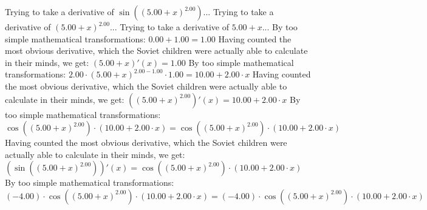 \documentclass{article}
\begin{document}
\newline
Trying to take a derivative of $ \sin {\left({\left({{5.00} + {x}}\right) ^ {2.00}}\right)} $...\newline
\newline
Trying to take a derivative of ${\left({{5.00} + {x}}\right) ^ {2.00}}$...\newline
\newline
Trying to take a derivative of ${{5.00} + {x}}$...\newline
\newline
By too simple mathematical transformations:
 ${{0.00} + {1.00}} = {1.00}$ 
 \newline
 \newline 
Having counted the most obvious derivative, which the Soviet children were actually able to calculate in their minds, we get:
$({{5.00} + {x}})'(x) = {1.00}$\newline
\newline
By too simple mathematical transformations:
 ${{{2.00} \cdot {\left({{5.00} + {x}}\right) ^ {{2.00} - {1.00}}}} \cdot {1.00}} = {{10.00} + {{2.00} \cdot {x}}}$ 
 \newline
 \newline 
Having counted the most obvious derivative, which the Soviet children were actually able to calculate in their minds, we get:
$({\left({{5.00} + {x}}\right) ^ {2.00}})'(x) = {{10.00} + {{2.00} \cdot {x}}}$\newline
\newline
By too simple mathematical transformations:
 ${ \cos {\left({\left({{5.00} + {x}}\right) ^ {2.00}}\right)}  \cdot \left({{10.00} + {{2.00} \cdot {x}}}\right)} = { \cos {\left({\left({{5.00} + {x}}\right) ^ {2.00}}\right)}  \cdot \left({{10.00} + {{2.00} \cdot {x}}}\right)}$ 
 \newline
 \newline 
Having counted the most obvious derivative, which the Soviet children were actually able to calculate in their minds, we get:
$( \sin {\left({\left({{5.00} + {x}}\right) ^ {2.00}}\right)} )'(x) = { \cos {\left({\left({{5.00} + {x}}\right) ^ {2.00}}\right)}  \cdot \left({{10.00} + {{2.00} \cdot {x}}}\right)}$\newline
\newline
By too simple mathematical transformations:
 ${\left({-4.00}\right) \cdot { \cos {\left({\left({{5.00} + {x}}\right) ^ {2.00}}\right)}  \cdot \left({{10.00} + {{2.00} \cdot {x}}}\right)}} = {\left({-4.00}\right) \cdot { \cos {\left({\left({{5.00} + {x}}\right) ^ {2.00}}\right)}  \cdot \left({{10.00} + {{2.00} \cdot {x}}}\right)}}$ 
\end{document}
